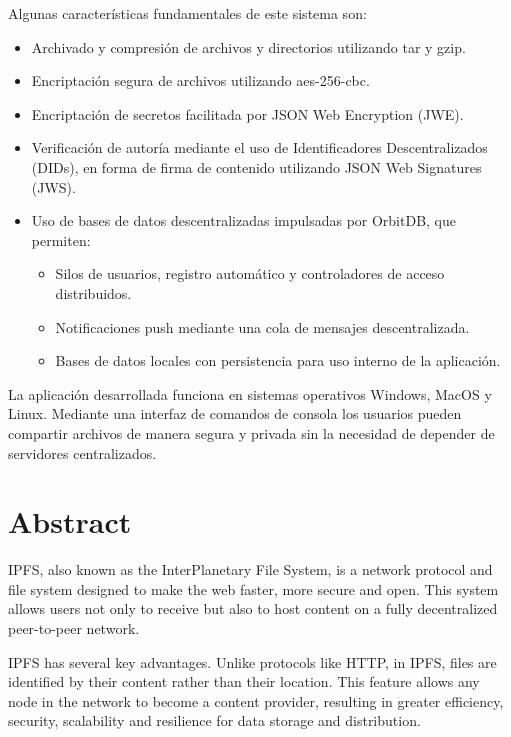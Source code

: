 Algunas características fundamentales de este sistema son:
\begin{itemize}[itemsep=1pt,nolistsep]
    \item Archivado y compresión de archivos y directorios utilizando tar y gzip.
    \item Encriptación segura de archivos utilizando aes-256-cbc.
    \item Encriptación de secretos facilitada por JSON Web Encryption (JWE).
    \item Verificación de autoría mediante el uso de Identificadores Descentralizados \\(DIDs), en forma de firma de contenido utilizando JSON Web Signatures (JWS).
    \item Uso de bases de datos descentralizadas impulsadas por OrbitDB, que permiten:
          \begin{itemize}
              \item Silos de usuarios, registro automático y controladores de acceso distribuidos.
              \item Notificaciones push mediante una cola de mensajes descentralizada.
              \item Bases de datos locales con persistencia para uso interno de la aplicación.
          \end{itemize}
\end{itemize}

La aplicación desarrollada funciona en sistemas operativos Windows, MacOS y Linux.
Mediante una interfaz de comandos de consola los usuarios pueden compartir archivos de manera segura y privada sin la necesidad de depender de servidores centralizados.


\chapter*{Abstract}



IPFS, also known as the InterPlanetary File System, is a network protocol and file system designed to make the web faster, more secure and open. This system allows users not only to receive but also to host content on a fully decentralized peer-to-peer network.

IPFS has several key advantages. Unlike protocols like HTTP, in IPFS, files are identified by their content rather than their location. This feature allows any node in the network to become a content provider, resulting in greater efficiency, security, scalability and resilience for data storage and distribution.


